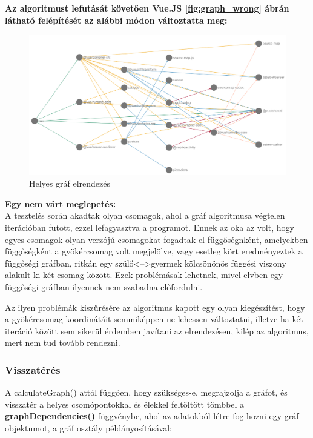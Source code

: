 \pagebreak

\noindent\textbf{Az algoritmust lefutását követően Vue.JS \ref{fig:graph_wrong} ábrán látható felépítését az alábbi módon változtatta meg:}

\begin{figure}[!h]
	\centering
	\includegraphics[scale=0.4]{images/graph_right.png}
	\caption{Helyes gráf elrendezés}
	\label{fig:graph_right}
\end{figure}

\noindent\textbf{Egy nem várt meglepetés:}\\

A tesztelés során akadtak olyan csomagok, ahol a gráf algoritmusa végtelen iterációban futott, ezzel lefagyasztva a programot.
Ennek az oka az volt, hogy egyes csomagok olyan verzójú csomagokat fogadtak el függőségnként, amelyekben függőségként a gyökércsomag volt megjelölve, vagy esetleg kört eredményeztek a függőségi gráfban, ritkán egy szülő<-->gyermek kölcsönönös függési viszony alakult ki két csomag között. Ezek problémásak lehetnek, mivel elvben egy függőségi gráfban ilyennek nem szabadna előfordulni.

Az ilyen problémák kiszűrésére az algoritmus kapott egy olyan kiegészítést, hogy a gyökércsomag koordinátáit semmiképpen ne lehessen változtatni, illetve ha két iteráció között sem sikerül érdemben javítani az elrendezésen, kilép az algoritmus, mert nem tud tovább rendezni.\\

\subsubsection{Visszatérés}

A calculateGraph() attól függően, hogy szükséges-e, megrajzolja a gráfot, és visszatér a helyes csomópontokkal és élekkel feltöltött tömbbel a \textbf{graphDependencies()} függvénybe, ahol az adatokból létre fog hozni egy gráf objektumot, a gráf osztály példányosításával:

